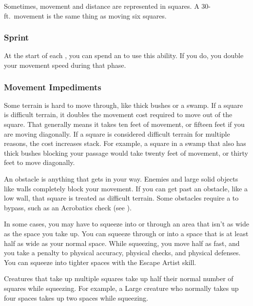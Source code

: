             Sometimes, movement and distance are represented in squares.
            A 30-ft.\ movement is the same thing as moving six squares.

        \subsubsection{Sprint}\label{Sprint}

            At the start of each , you can spend an  to use this ability.
            If you do, you double your movement speed during that phase.

        \subsubsection{Movement Impediments}

            \label{Difficult Terrain}
            Some terrain is hard to move through, like thick bushes or a swamp. If a square is difficult terrain, it doubles the movement cost required to move out of the square. That generally means it takes ten feet of movement, or fifteen feet if you are moving diagonally. If a square is considered difficult terrain for multiple reasons, the cost increases stack. For example, a square in a swamp that also has thick bushes blocking your passage would take twenty feet of movement, or thirty feet to move diagonally.

            An obstacle is anything that gets in your way. Enemies and large solid objects like walls completely block your movement. If you can get past an obstacle, like a low wall, that square is treated as difficult terrain. Some obstacles require a  to bypass, such as an Acrobatics check (see ).

            \label{Squeezing}
            In some cases, you may have to squeeze into or through an area that isn't as wide as the space you take up. You can squeeze through or into a space that is at least half as wide as your normal space. While squeezing, you move half as fast, and you take a  penalty to physical accuracy, physical checks, and physical defenses. You can squeeze into tighter spaces with the Escape Artist skill.

            Creatures that take up multiple squares take up half their normal number of squares while squeezing. For example, a Large creature who normally takes up four spaces takes up two spaces while squeezing.

